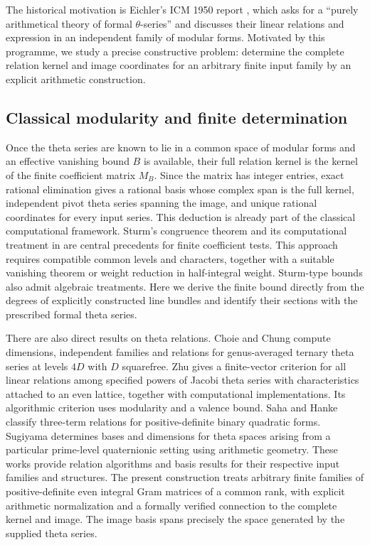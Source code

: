 \documentclass[11pt]{article}
\theoremstyle{remark}\newtheorem{remark}[theorem]{Remark}
\begin{document}
The historical motivation is Eichler's ICM 1950 report
\cite[p.~70]{eichler}, which asks for a ``purely arithmetical theory of formal
$\theta$-series'' and discusses their linear relations and expression in an
independent family of modular forms. Motivated by this programme, we study
a precise constructive problem: determine the complete relation kernel and
image coordinates for an arbitrary finite input family by an explicit
arithmetic construction.

\subsection{Classical modularity and finite determination}
Once the theta series are known to lie in a common space of modular forms
and an effective vanishing bound $B$ is available, their full relation kernel
is the kernel of the finite coefficient matrix $M_B$. Since the matrix has
integer entries, exact rational elimination gives a rational basis whose
complex span is the full kernel, independent pivot theta series spanning the
image, and unique rational coordinates for every input series. This deduction
is already part of the classical computational framework. Sturm's congruence
theorem \cite{sturm} and its computational treatment in
\cite[Section 9.4.1.2, Theorem 9.18]{stein} are central precedents for finite
coefficient tests. This approach requires compatible common levels and
characters, together with a suitable vanishing theorem or weight reduction
in half-integral weight. Sturm-type bounds also admit algebraic treatments.
Here we derive the finite bound directly from the degrees of explicitly
constructed line bundles and identify their sections with the prescribed
formal theta series.

There are also direct results on theta relations. Choie and Chung
\cite{choie-chung} compute dimensions, independent families and relations
for genus-averaged ternary theta series at levels $4D$ with $D$ squarefree.
Zhu \cite[Theorem 7.10]{zhu} gives a finite-vector criterion for all linear
relations among specified powers of Jacobi theta series with characteristics
attached to an even lattice, together with computational implementations.
Its algorithmic criterion uses modularity and a valence bound. Saha and Hanke
\cite[Theorem 1.1]{saha-hanke} classify three-term relations for positive-definite
binary quadratic forms. Sugiyama \cite{sugiyama} determines bases and
dimensions for theta spaces arising from a particular prime-level
quaternionic setting using arithmetic geometry. These works provide
relation algorithms and basis results for their respective input families
and structures. The present construction treats arbitrary finite families
of positive-definite even integral Gram matrices of a common rank, with
explicit arithmetic normalization and a formally verified connection to
the complete kernel and image. The image basis spans precisely the space
generated by the supplied theta series.
\end{document}
